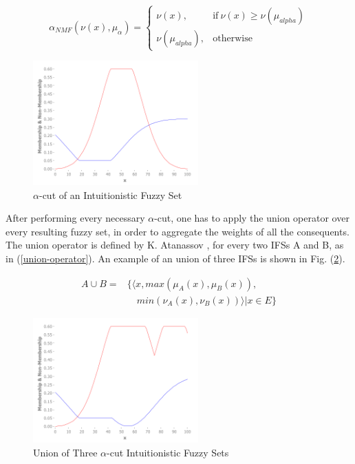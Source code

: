 \documentclass[conference]{IEEEtran}
\begin{document}
\begin{equation}
  \label{nmf-alpha-cut}
  \alpha_{NMF}(\nu (x),\mu_{\alpha}) =
  \begin{cases}
    \nu (x), & \text{if}\ \nu (x) \geq \nu (\mu_{alpha})  \\
    \nu (\mu_{alpha}), & \text{otherwise}
  \end{cases}
\end{equation}

\begin{figure}[!t]
  \centering
  \includegraphics[width=2.5in]{alpha-cut}
  \caption{$\alpha$-cut of an Intuitionistic Fuzzy Set}
  \label{alpha-cut-example}
\end{figure}

After performing every necessary $\alpha$-cut, one has to apply the
union operator over every resulting fuzzy set, in order to aggregate
the weights of all the consequents. The union operator is defined by
K. Atanassov \cite{atanassov2013intuitionistic}, for every two IFSs A
and B, as in (\ref{union-operator}). An example of an union of three
IFSs is shown in Fig. (\ref{ifs-union}).

\begin{equation}
  \label{union-operator}
  \begin{aligned}
    A \cup B  = &\{ \langle x, max(\mu_{A} (x), \mu_{B} (x)),\\
    &\quad min(\nu_{A} (x), \nu_{B} (x)) \rangle | x \in E \}
\end{aligned}
\end{equation}

\begin{figure}[!t]
  \centering
  \includegraphics[width=2.5in]{ifs-union}
  \caption{Union of Three $\alpha$-cut Intuitionistic Fuzzy Sets}
  \label{ifs-union}
\end{figure}
\end{document}
